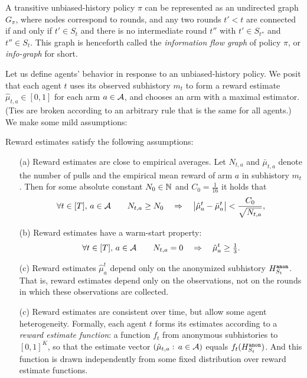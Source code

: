 A transitive unbiased-history policy $\pi$ can be represented as an undirected graph $G_\pi$, where nodes correspond to rounds, and any two rounds $t'<t$ are connected if and only if $t'\in S_t$ and there is no intermediate round $t''$ with
    $t'\in S_{t''}$ and $t''\in S_t$.
This graph is henceforth called the \emph{information flow graph} of policy $\pi$, or \emph{info-graph} for short.

 Let us define agents' behavior in response to an unbiased-history policy. We posit that each agent $t$ uses its observed subhistory $m_t$ to form a reward estimate $\hat{\mu}_{t,a} \in [0,1]$ for each arm $a\in \mathcal{A}$, and chooses an arm with a maximal estimator. (Ties are broken according to an arbitrary rule that is the same for all agents.)
We make some mild assumptions:


\begin{assumption}\label{ass:embehave}
Reward estimates satisfy the following assumptions:
\begin{itemize}
\item[(a)] Reward estimates are close to empirical averages. Let $N_{t,a}$ and $\bar{\mu}_{t,a}$ denote the number of pulls and the empirical mean reward of arm $a$ in subhistory $m_t$. Then for some absolute constant $N_0\in \mathbb{N}$ and $C_0=\tfrac{1}{16}$ it holds that
\[
\forall t\in[T],\, a\in\mathcal{A} \qquad
N_{t,a} \geq N_0 \quad\Rightarrow\quad
    \left|\hat{\mu}^t_a - \bar{\mu}^t_a \right| <
		\frac{C_0}{\sqrt{N_{t,a}}},
\]
\item[(b)] Reward estimates have a warm-start property:
\[
\forall t\in[T],\, a\in\mathcal{A} \qquad
N_{t,a} =0 \quad\Rightarrow\quad
    \hat{\mu}^t_a \geq \tfrac13.
\]

\item[(c)] Reward estimates $\hat{\mu}_a^t$ depend only on the anonymized subhistory $H^{\texttt{anon}}_{S_t}$. That is, reward estimates depend only on the observations, not on the rounds in which these observations are collected.

\item[(c)] Reward estimates are consistent over time, but allow some agent heterogeneity. Formally, each agent $t$ forms its estimates according to a \emph{reward estimate function}: a function $f_t$ from anonymous subhistories to $[0,1]^K$, so that the estimate vector
        $(\hat{\mu}_{t,a}:\, a\in\mathcal{A})$
    equals $f_t(H^{\texttt{anon}}_{S_t})$. And this function is drawn independently from some fixed distribution over reward estimate functions.
\end{itemize}
\end{assumption}

